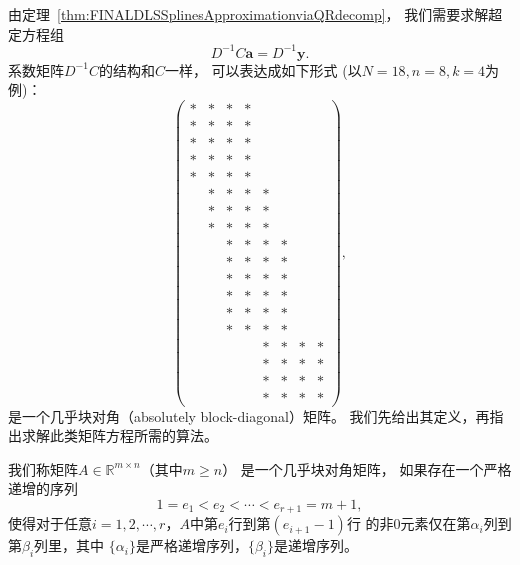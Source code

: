   由定理~\ref{thm:FINALDLSSplinesApproximationviaQRdecomp}，
  我们需要求解超定方程组
  \begin{equation}
    \label{eq:FINALDLSSplinesQRmatrix}
    D^{-1}C\mathbf{a}=D^{-1}\mathbf{y}.
  \end{equation}
  系数矩阵$D^{-1}C$的结构和$C$一样，
  可以表达成如下形式 (以$N=18,n=8,k=4$为例)：
  \begin{equation}
    \label{eq:FINALABDmatrixEg}
    \begin{pmatrix}
      \ast& \ast& \ast& \ast&  &  &  &\\
      \ast& \ast& \ast& \ast&  &  &  &\\
      \ast& \ast& \ast& \ast&  &  &  &\\
      \ast& \ast& \ast& \ast&  &  &  &\\
      \ast& \ast& \ast& \ast&  &  &  &\\
          & \ast& \ast& \ast& \ast&  &  &\\
          & \ast& \ast& \ast& \ast&  &  &\\
          & \ast& \ast& \ast& \ast&  &  &\\
          &  & \ast& \ast& \ast& \ast&  &\\
          &  & \ast& \ast& \ast& \ast&  &\\
          &  & \ast& \ast& \ast& \ast&  &\\
          &  & \ast& \ast& \ast& \ast&  &\\
          &  & \ast& \ast& \ast& \ast&  &\\
          &  & \ast& \ast& \ast& \ast&  &\\
          &  &  &  & \ast& \ast& \ast& \ast\\
          &  &  &  & \ast& \ast& \ast& \ast\\
          &  &  &  & \ast& \ast& \ast& \ast\\
          &  &  &  & \ast& \ast& \ast& \ast
    \end{pmatrix},
  \end{equation}
  是一个几乎块对角（absolutely block-diagonal）矩阵。
  我们先给出其定义，再指出求解此类矩阵方程所需的算法。

  \begin{defn}
    \label{def:FINALABDmatrix}
    我们称矩阵$A\in \mathbb{R}^{m\times n}$（其中$m\ge n$）
    是一个几乎块对角矩阵，
    如果存在一个严格递增的序列
    \begin{displaymath}
      1=e_{1}<e_{2}<\cdots<e_{r+1}=m+1,
    \end{displaymath}
    使得对于任意$i=1,2,\cdots,r$，$A$中第$e_i$行到第$(e_{i+1} - 1)$行
    的非$0$元素仅在第$\alpha_i$列到第$\beta_i$列里，其中
    $\{\alpha_i\}$是严格递增序列，$\{\beta_i\}$是递增序列。
  \end{defn}

